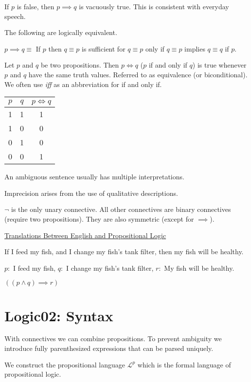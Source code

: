 \documentclass{article}
\begin{document}
If $p$ is false, then $p \implies q$ is vacuously true. This is consistent with everyday speech. 

The following are logically equivalent. 

$p \implies q \equiv $ If $p$ then $q \equiv p$ is sufficient for $q \equiv p $ only if $q \equiv p $ implies $q \equiv q$ if $p$. 

Let $p$ and $q$ be two propositions. Then $p \iff q$ ($p$ if and only if $q$) is true whenever $p$ and $q$ have the same truth values. Referred to as equivalence (or biconditional). We often use \textit{iff} as an abbreviation for if and only if. 

\begin{table}[h]
    \centering
    \begin{tabular}{|c|c|c|} \hline
    $p$ & $q$ & $p \iff q$\\ \hline
    1 & 1 & 1 \\ \hline
    1 & 0 & 0 \\ \hline 
    0 & 1 & 0 \\ \hline 
    0 & 0 & 1   \\ \hline
    \end{tabular}
\end{table}

An ambiguous sentence usually has multiple interpretations. 

Imprecision arises from the use of qualitative descriptions. 

$\neg$ is the only unary connective. All other connectives are binary connectives (require two propositions). They are also symmetric (except for $\implies$). 

\underline{Translations Between English and Propositional Logic}

If I feed my fish, and I change my fish's tank filter, then my fish will be healthy. 

$p:$ I feed my fish, $q:$ I change my fish's tank filter, $r:$ My fish will be healthy. 

$((p \wedge q) \implies r)$


\section{Logic02: Syntax}

With connectives we can combine propositions. To prevent ambiguity we introduce fully parenthesized expressions that can be parsed uniquely. 

We construct the propositional language $\mathcal{L}^p$ which is the formal language of propositional logic. 
\end{document}
